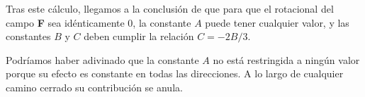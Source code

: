 Tras este cálculo, llegamos a la conclusión de que para que el rotacional del campo \textbf{F} sea idénticamente 0,
la constante $A$ puede tener cualquier valor,
y las constantes $B$ y $C$ deben cumplir la relación $C = -2 B / 3$.

Podríamos haber adivinado que la constante $A$ no está restringida a ningún valor porque su efecto es constante en todas
las direcciones. A lo largo de cualquier camino cerrado su contribución se anula.






